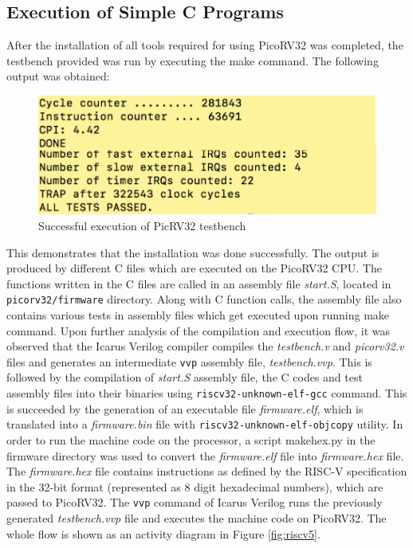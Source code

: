 \subsection{Execution of Simple C Programs}
 \label{sect6_3_3}
After the installation of all tools required for using PicoRV32 was completed, the testbench provided was run by executing the make command. The following output was obtained:
\begin{figure}[h!]
\centering
\includegraphics[width=\linewidth]{figures/PicoRV32_Execution.png}
\caption{Successful execution of PicRV32 testbench}
\label{fig:riscv4}
\end{figure}
This demonstrates that the installation was done successfully. The output is produced by different C files which are executed on the PicoRV32 CPU. The functions written in the C files are called in an assembly file \textit{start.S}, located in \verb|picorv32/firmware| directory. Along with C function calls, the assembly file also contains various tests in assembly files which get executed upon running make command. \newline\newline
Upon further analysis of the compilation and execution flow, it was observed that the Icarus Verilog compiler compiles the \textit{testbench.v} and \textit{picorv32.v} files and generates an intermediate \verb|vvp| assembly file, \textit{testbench.vvp}. This is followed by the compilation of \textit{start.S} assembly file, the C codes and test assembly files into their binaries using \verb|riscv32-unknown-elf-gcc| command. This is succeeded by the generation of an executable file \textit{firmware.elf}, which is translated into a \textit{firmware.bin} file with \verb|riscv32-unknown-elf-objcopy| utility. In order to run the machine code on the processor, a script makehex.py in the firmware directory was used to convert the \textit{firmware.elf} file into \textit{firmware.hex} file. The \textit{firmware.hex} file contains instructions as defined by the RISC-V specification in the 32-bit format (represented as 8 digit hexadecimal numbers), which are passed to PicoRV32. The \verb|vvp| command of Icarus Verilog runs the previously generated \textit{testbench.vvp} file and executes the machine code on PicoRV32. The whole flow is shown as an activity diagram in Figure \ref{fig:riscv5}.\newline\newline
